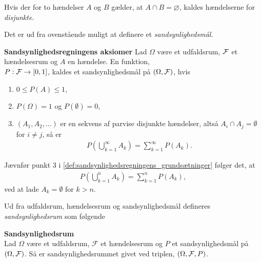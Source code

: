 Hvis der for to hændelser $A$ og $B$ gælder, at $A \cap B = \varnothing$, kaldes hændelserne for \textit{disjunkte}.

Det er ud fra ovenstående muligt at definere et \textit{sandsynlighedsmål}.

\begin{defn}\textbf{Sandsynlighedsregningens aksiomer} \label{def:sandsynlighedsregningens_grundsætninger}%
\newline
Lad $\Omega$ være et udfaldsrum, $\mathcal{F}$ et hændelsesrum og $A$ en hændelse. En funktion,\\ $P: \mathcal{F} \to [0,1]$, kaldes et sandsynlighedsmål på $(\Omega, \mathcal{F})$, hvis
\begin{enumerate}
    \item $0 \leq P(A) \leq 1$,
    \item $P(\Omega) = 1$ og $P(\emptyset)=0$,
    \item $(A_1, A_2, \ldots) $ er en sekvens af parvise disjunkte hændelser, altså $A_i \cap A_j = \emptyset$ for $i \neq j$, så er
    \begin{align*}
        P\left(\bigcup_{k=1}^\infty A_k \right) = \sum_{k=1}^\infty P(A_k).
    \end{align*}
\end{enumerate}
\end{defn}

Jævnfør punkt 3 i \autoref{def:sandsynlighedsregningens_grundsætninger} følger det, at
\begin{align*}
    P\left(\bigcup_{k=1}^n A_k \right) = \sum_{k=1}^n P(A_k),
\end{align*}
ved at lade $A_k = \emptyset$ for $k > n$.

Ud fra udfaldsrum, hændelsesrum og sandsynlighedsmål defineres \textit{sandsynlighedsrum} som følgende

\begin{minipage}\textwidth
\begin{defn}\textbf{Sandsynlighedsrum} \label{def:sandsynlighedsrum}\\
    Lad $\Omega$ være et udfaldsrum, $\mathcal{F}$ et hændelsesrum og $P$ et sandsynlighedsmål på $(\Omega, \mathcal{F})$. Så er sandsynlighedsrummet givet ved triplen, $(\Omega, \mathcal{F}, P)$. 
\end{defn}
\end{minipage}

\pagebreak




